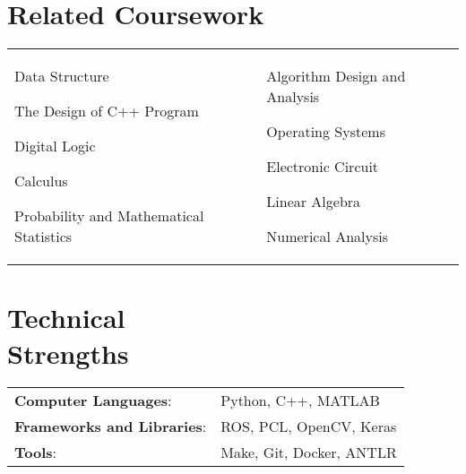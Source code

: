 \documentclass[margin,line,pifont,palatino,courier]{res}
\newenvironment{list1}{
	\begin{list}{\ding{113}}{%
			\setlength{\itemsep}{0in}
			\setlength{\parsep}{0in} \setlength{\parskip}{0in}
			\setlength{\topsep}{0in} \setlength{\partopsep}{0in}
			\setlength{\leftmargin}{0.17in}}}{\end{list}}
\begin{document}
\begin{resume}
		\section{\sc Related Coursework}
		
		\begin{tabular}{@{}p{2.6in}p{3in}}
			\begin{list1}
				\item Data Structure
				\item The Design of C++ Program
				\item Digital Logic
				\item Calculus
				\item Probability and Mathematical Statistics
			\end{list1}
			&
			\begin{list1}
				\item Algorithm Design and Analysis
				\item Operating Systems
				\item Electronic Circuit
				\item Linear Algebra
				\item Numerical Analysis
			\end{list1}
			
		\end{tabular}
		
		\section{\sc Technical\\Strengths}
		
		\begin{tabular}{@{}p{2.2in}p{3in}}
			{\bf Computer Languages}: & Python, C++, MATLAB  \\
			{\bf Frameworks and Libraries}: & ROS, PCL, OpenCV, Keras\\
			{\bf Tools}: & Make, Git, Docker, ANTLR
		\end{tabular}
		

\end{resume}
\end{document}
